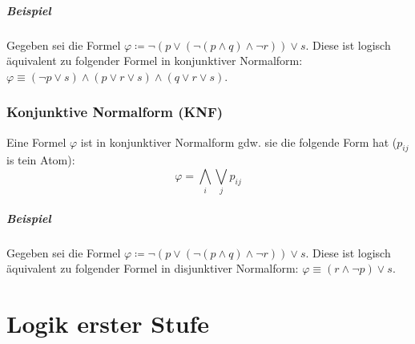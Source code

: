 \documentclass[a4paper, 11pt, accentcolor = tud3b]{tudreport}
\begin{document}
                \paragraph{Beispiel}
                    Gegeben sei die Formel $ \varphi \coloneqq \lnot (p \lor (\lnot (p \land q) \land \lnot r)) \lor s $. Diese ist logisch äquivalent zu folgender Formel in konjunktiver Normalform: $ \varphi \equiv (\lnot p \lor s) \land (p \lor r \lor s) \land (q \lor r \lor s) $.

            \subsection{Konjunktive Normalform (KNF)}
                Eine Formel $ \varphi $ ist in konjunktiver Normalform gdw. sie die folgende Form hat ($ p _ { ij } $ is tein Atom):
                \begin{equation*}
                    \varphi = \bigwedge _ i \bigvee _ j p _ { ij }
                \end{equation*}

                \paragraph{Beispiel}
                    Gegeben sei die Formel $ \varphi \coloneqq \lnot (p \lor (\lnot (p \land q) \land \lnot r)) \lor s $. Diese ist logisch äquivalent zu folgender Formel in disjunktiver Normalform: $ \varphi \equiv (r \land \lnot p) \lor s $.


    \chapter{Logik erster Stufe}
\end{document}
